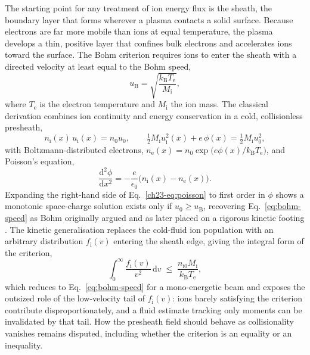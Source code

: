 The starting point for any treatment of ion energy flux is the sheath, the boundary layer that forms wherever a plasma contacts a solid surface. Because electrons are far more mobile than ions at equal temperature, the plasma develops a thin, positive layer that confines bulk electrons and accelerates ions toward the surface. The Bohm criterion requires ions to enter the sheath with a directed velocity at least equal to the Bohm speed,
\begin{equation}
u_{\mathrm{B}} = \sqrt{\frac{k_{\mathrm{B}} T_{\mathrm{e}}}{M_{\mathrm{i}}}},
\label{eq:bohm-speed}
\end{equation}
where $T_{\mathrm{e}}$ is the electron temperature and $M_{\mathrm{i}}$ the ion mass. The classical derivation combines ion continuity and energy conservation in a cold, collisionless presheath,
\begin{equation}
n_{\mathrm{i}}(x)\,u_{\mathrm{i}}(x) = n_{0}u_{0}, \qquad
\tfrac{1}{2}M_{\mathrm{i}}u_{\mathrm{i}}^{2}(x) + e\,\phi(x) = \tfrac{1}{2}M_{\mathrm{i}}u_{0}^{2},
\end{equation}
with Boltzmann-distributed electrons, $n_{\mathrm{e}}(x) = n_{0}\exp\!\big(e\phi(x)/k_{\mathrm{B}}T_{\mathrm{e}}\big)$, and Poisson's equation,
\begin{equation}
\frac{\mathrm{d}^{2}\phi}{\mathrm{d}x^{2}} = -\frac{e}{\epsilon_{0}}\big(n_{\mathrm{i}}(x) - n_{\mathrm{e}}(x)\big).
\label{ch23-eq:poisson}
\end{equation}
Expanding the right-hand side of Eq.~\eqref{ch23-eq:poisson} to first order in $\phi$ shows a monotonic space-charge solution exists only if $u_{0} \ge u_{\mathrm{B}}$, recovering Eq.~\eqref{eq:bohm-speed} as Bohm originally argued and as later placed on a rigorous kinetic footing \cite{ref0001}. The kinetic generalisation replaces the cold-fluid ion population with an arbitrary distribution $f_{\mathrm{i}}(v)$ entering the sheath edge, giving the integral form of the criterion,
\begin{equation}
\int_{0}^{\infty} \frac{f_{\mathrm{i}}(v)}{v^{2}}\,\mathrm{d}v \;\le\; \frac{n_{\mathrm{i}0} M_{\mathrm{i}}}{k_{\mathrm{B}} T_{\mathrm{e}}},
\label{eq:kinetic-bohm-review}
\end{equation}
which reduces to Eq.~\eqref{eq:bohm-speed} for a mono-energetic beam and exposes the outsized role of the low-velocity tail of $f_{\mathrm{i}}(v)$: ions barely satisfying the criterion contribute disproportionately, and a fluid estimate tracking only moments can be invalidated by that tail. How the presheath field should behave as collisionality vanishes remains disputed, including whether the criterion is an equality or an inequality.

